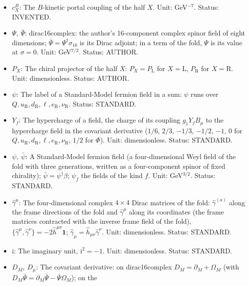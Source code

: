 \documentclass[
  10pt,
]{article}
\begin{document}
\begin{itemize}
  \(\mathcal{D}_X^{\mu\nu} = \mathrm{i}\bar\Psi\Sigma^{\mu\nu}P_X\Psi\)
  (real, DERIVED). Unit: GeV\(^7\). Status: DERIVED.
\item
  \(c^{B}_X\): The \(B\)-kinetic portal coupling of the half \(X\).
  Unit: GeV\(^{-7}\). Status: INVENTED.
\item
  \(\Psi,\ \bar\Psi\): dirac16complex: the author's 16-component complex
  spinor field of eight dimensions;
  \(\bar\Psi = \Psi^\dagger\sigma_{16}\) is its Dirac adjoint; in a term
  of the fold, \(\Psi\) is its value at \(\sigma = 0\). Unit:
  GeV\(^{7/2}\). Status: AUTHOR.
\item
  \(P_X\): The chiral projector of the half \(X\):
  \(P_X = P_{\mathrm{L}}\) for \(X = \mathrm{L}\), \(P_{\mathrm{R}}\)
  for \(X = \mathrm{R}\). Unit: dimensionless. Status: AUTHOR.
\item
  \(\psi\): The label of a Standard-Model fermion field in a sum:
  \(\psi\) runs over
  \(Q, u_{\mathrm{R}}, d_{\mathrm{R}}, \ell, e_{\mathrm{R}}, \nu_{\mathrm{R}}\).
  Status: STANDARD.
\item
  \(Y_f\): The hypercharge of a field, the charge of its coupling
  \(g_1Y_fB_\mu\) to the hypercharge field in the covariant derivative
  (\(1/6\), \(2/3\), \(-1/3\), \(-1/2\), \(-1\), \(0\) for
  \(Q, u_{\mathrm{R}}, d_{\mathrm{R}}, \ell, e_{\mathrm{R}}, \nu_{\mathrm{R}}\),
  \(1/2\) for \(\Phi\)). Unit: dimensionless. Status: STANDARD.
\item
  \(\psi,\ \bar\psi\): A Standard-Model fermion field (a
  four-dimensional Weyl field of the fold with three generations,
  written as a four-component spinor of fixed chirality);
  \(\bar\psi = \psi^\dagger\beta\); \(\psi_f\) the fields of the kind
  \(f\). Unit: GeV\(^{3/2}\). Status: STANDARD.
\item
  \(\hat\gamma^\mu\): The four-dimensional complex \(4 \times 4\) Dirac
  matrices of the fold: \(\hat\gamma^{(a)}\) along the frame directions
  of the fold and \(\hat\gamma^\mu\) along its coordinates (the frame
  matrices contracted with the inverse frame field of the fold),
  \(\{\hat\gamma^\mu, \hat\gamma^\nu\} = -2\hat h^{\mu\nu}\mathbf{1}\);
  \(\hat\gamma_\mu = \hat h_{\mu\nu}\hat\gamma^\nu\). Unit:
  dimensionless. Status: STANDARD.
\item
  \(\mathrm{i}\): The imaginary unit, \(\mathrm{i}^2 = -1\). Unit:
  dimensionless. Status: STANDARD.
\item
  \(D_M,\ D_\mu\): The covariant derivative: on dirac16complex
  \(D_M = \partial_M + \Omega_M\) (with
  \(D_M\bar\Psi = \partial_M\bar\Psi - \bar\Psi\Omega_M\)); on the

\end{itemize}
\end{document}
